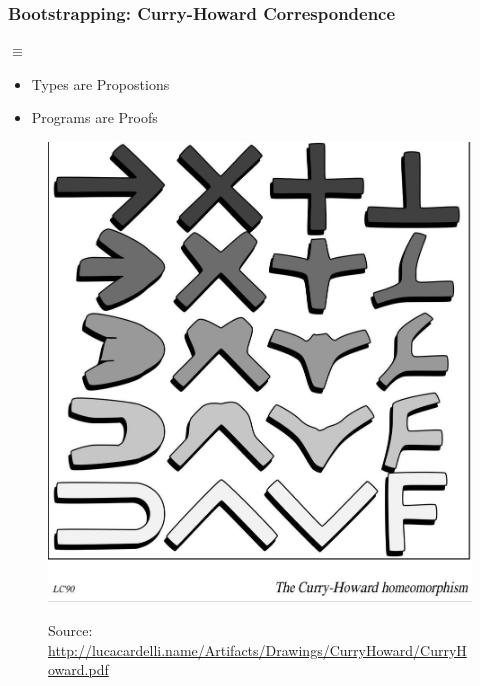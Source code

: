 \begin{frame}[c]
  \frametitle{Bootstrapping: Curry-Howard Correspondence}
  \begin{center}
       $\equiv$ 
    \begin{itemize}
    \item Types are Propostions
    \item Programs are Proofs
    \end{itemize}

    \begin{figure}[h]
      \centering
      \includegraphics[scale=0.1]{defense-slides/cardelli-hc-corr.jpg}

      {{\tiny Source: \url{http://lucacardelli.name/Artifacts/Drawings/CurryHoward/CurryHoward.pdf}}}
    \end{figure}
\end{center}
\end{frame}

